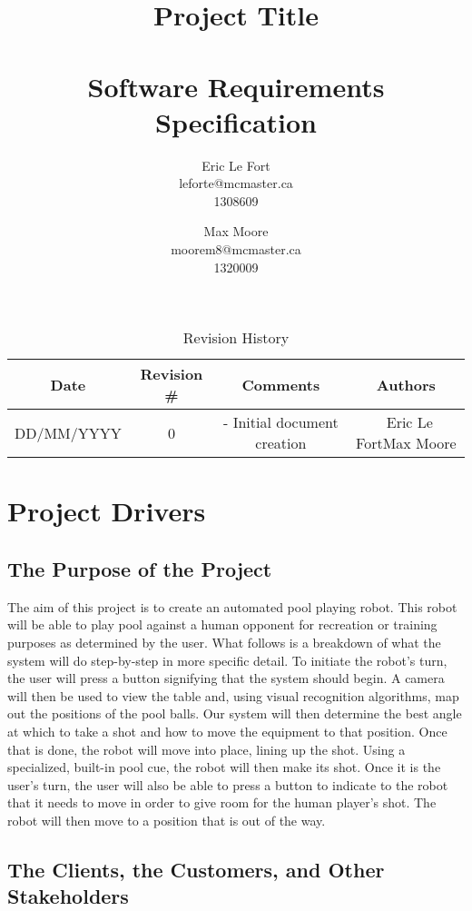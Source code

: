 \documentclass[titlepage]{article}
\title{Project Title\\~\\Software Requirements Specification}
\author{
Eric Le Fort\\leforte@mcmaster.ca\\1308609\and
Max Moore\\moorem8@mcmaster.ca\\1320009
}
\begin{document}
\maketitle


\tableofcontents
\listoffigures
\listoftables


\vfill
\begin{table}[!htbp]
\centering
\begin{tabular}{| C{3} | C{2} | C{5} | C{2.5} |}\hline
	Date			&Revision \#	&Comments						&Authors\\\hline
	DD/MM/YYYY		&0				&- Initial document creation	&~Eric Le Fort\newline Max Moore\\\hline
\end{tabular}
\caption{Revision History}
\end{table}
\newpage


\section{Project Drivers}
\subsection{The Purpose of the Project}
The aim of this project is to create an automated pool playing robot. This robot will be able to play pool against a
human opponent for recreation or training purposes as determined by the user.
What follows is a breakdown of what the system will do step-by-step in more specific detail. To initiate the robot's
turn, the user will press a button signifying that the system should begin. A camera will then be used to view the table
and, using visual recognition algorithms, map out the positions of the pool balls. Our system will then determine the best
angle at which to take a shot and how to move the equipment to that position. Once that is done, the robot will move
into place, lining up the shot. Using a specialized, built-in pool cue, the robot will then make its shot.
Once it is the user's turn, the user will also be able to press a button to indicate to the robot that it needs to move in
order to give room for the human player's shot. The robot will then move to a position that is out of the way.


\subsection{The Clients, the Customers, and Other Stakeholders}
\end{document}
